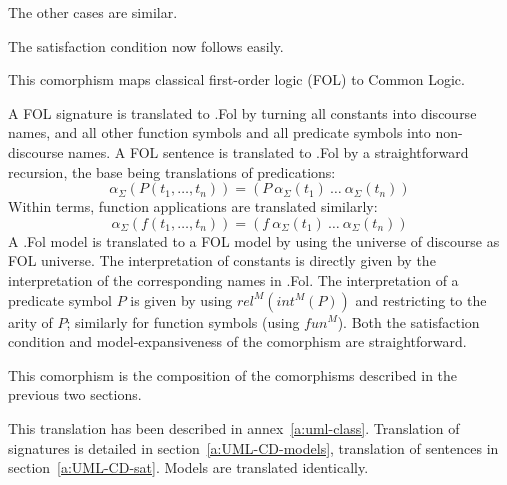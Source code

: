 \documentclass[10pt, a4paper]{isov2}
\newcommand*{\CL}{\ensuremath{\mathsf{CL}}\xspace}
\begin{document}
        The other cases are similar.

	 The satisfaction condition now follows easily.


\ssclause{$FOL \rightarrow \CL$}

This comorphism  maps classical first-order logic (FOL) to Common Logic.


A FOL signature is translated to \Clogic.Fol by turning all constants
into discourse names, and all other function symbols and all predicate
symbols into non-discourse names. A FOL sentence is translated
to \Clogic.Fol by a straightforward recursion, the base being translations
of predications:
$$\alpha_\Sigma(P(t_1,\ldots,t_n)) = (P\ \alpha_\Sigma(t_1)\ \ldots\ \alpha_\Sigma(t_n))$$
Within terms, function applications are translated similarly:
$$\alpha_\Sigma(f(t_1,\ldots,t_n)) = (f\ \alpha_\Sigma(t_1)\ \ldots\ \alpha_\Sigma(t_n))$$
A \Clogic.Fol model is translated to a FOL model by using the universe of
discourse as FOL universe. The interpretation of constants is
directly given by the interpretation of the corresponding names
in \Clogic.Fol. The interpretation of a predicate symbol $P$ is given
by using $rel^M(int^M(P))$ and restricting to the arity of $P$;
similarly for function symbols (using $fun^M$). Both the satisfaction condition
and model-expansiveness of the comorphism are straightforward.


\ssclause{$\OWL \rightarrow \CL$}

This comorphism is the composition of the comorphisms described in the previous
two sections.

\ssclause{UML class models $\to \CL$}


This translation has been described in annex~\ref{a:uml-class}. 
Translation of signatures is detailed in section~\ref{a:UML-CD-models},
translation of sentences in section~\ref{a:UML-CD-sat}.
Models are translated identically.
\end{document}
